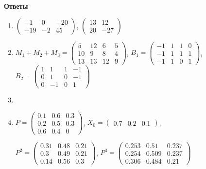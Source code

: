 \documentclass[a4paper,14pt]{extarticle}
\begin{document}
\newpage
{\centering\bfseries Ответы\par}
\begin{enumerate}[itemsep=5mm]
\item %
	 $\begin{pmatrix} -1 & 0 & -20\\ -19 & -2 & 45\end{pmatrix}$,\quad
	$\begin{pmatrix}13 & 12\\ 20 & -27\end{pmatrix}$
\item %
	$M_1+M_2+M_3
	=\begin{pmatrix}
		5 & 12 & 6 & 5\\
		10 & 9 & 8 & 4\\
		13 & 13 & 12 & 9
	\end{pmatrix}$, 
	\quad
	$B_1
	=\begin{pmatrix}
		-1 & 1 & 1 & 0\\
		-1 & 1 & 1 & 1\\
		-1 & 1 & 0 & 1
	\end{pmatrix}$,
	\quad
	$B_2=
	\begin{pmatrix}
		1 & 1 & 1 & -1\\
		0 & 1 & 0 & -1\\
		0 & -1 & 0 & 1
	\end{pmatrix}$
\item %
\item %
	$P=\begin{pmatrix}
		0.1 & 0.6 & 0.3\\
		0.2 & 0.5 & 0.3\\
		0.6 & 0.4 & 0
		\end{pmatrix}$,\quad
	$X_0=\begin{pmatrix}
		0.7 & 0.2 & 0.1
		\end{pmatrix}$,
		
$P^2=\begin{pmatrix}
		0.31 & 0.48 & 0.21\\
		0.3 & 0.49 & 0.21\\
		0.14 & 0.56 & 0.3
	\end{pmatrix}$,\quad
$P^3=\begin{pmatrix}
	0.253 & 0.51 & 0.237\\
	0.254 & 0.509 & 0.237\\
	0.306 & 0.484 & 0.21
	\end{pmatrix}$
	

\end{enumerate}
\end{document}
